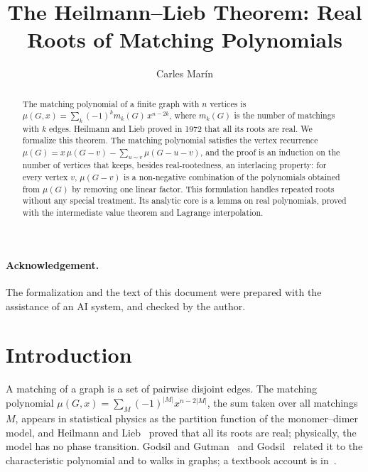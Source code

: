 \documentclass[10pt,a4paper]{article}
\begin{document}
\title{The Heilmann--Lieb Theorem: Real Roots of Matching Polynomials}
\author{Carles Mar\'in}
\maketitle

\begin{abstract}
The matching polynomial of a finite graph with $n$ vertices is
$\mu(G, x) = \sum_k (-1)^k m_k(G)\, x^{n-2k}$, where $m_k(G)$ is the number of matchings with $k$ edges.
Heilmann and Lieb proved in 1972 that all its roots are real. We formalize this theorem. The matching polynomial
satisfies the vertex recurrence $\mu(G) = x\,\mu(G-v) - \sum_{u \sim v} \mu(G-u-v)$, and the proof is an induction on
the number of vertices that keeps, besides real-rootedness, an interlacing property: for every vertex $v$,
$\mu(G-v)$ is a non-negative combination of the polynomials obtained from $\mu(G)$ by removing one linear factor.
This formulation handles repeated roots without any special treatment. Its analytic core is a lemma on real
polynomials, proved with the intermediate value theorem and Lagrange interpolation.
\end{abstract}

\paragraph{Acknowledgement.} The formalization and the text of this document were prepared with the
assistance of an AI system, and checked by the author.

\tableofcontents

\section*{Introduction}

A matching of a graph is a set of pairwise disjoint edges. The matching polynomial
$\mu(G, x) = \sum_M (-1)^{|M|} x^{n - 2|M|}$, the sum taken over all matchings $M$, appears in statistical physics as
the partition function of the monomer--dimer model, and Heilmann and Lieb~\cite{HeilmannLieb1972} proved that all its
roots are real; physically, the model has no phase transition. Godsil and Gutman~\cite{GodsilGutman1981} and
Godsil~\cite{Godsil1981} related it to the characteristic polynomial and to walks in graphs; a textbook account is
in~\cite{Godsil1993}.
\end{document}
